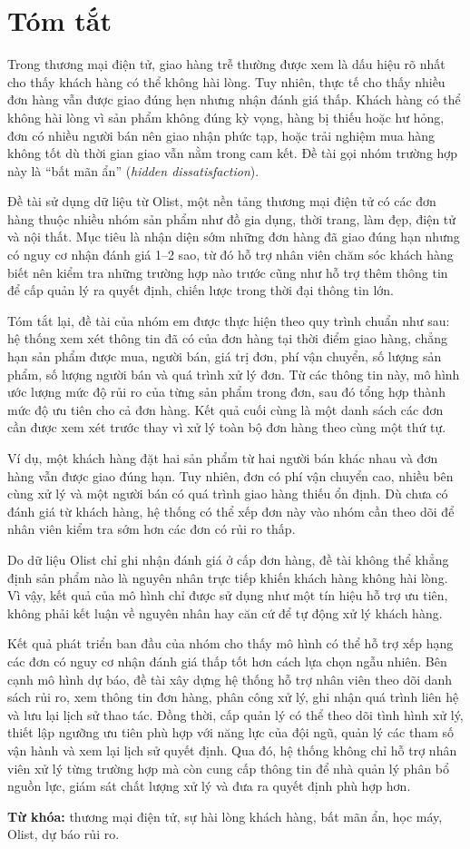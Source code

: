 \chapter*{Tóm tắt}

Trong thương mại điện tử, giao hàng trễ thường được xem là dấu hiệu rõ nhất cho thấy khách hàng có thể không hài lòng. Tuy nhiên, thực tế cho thấy nhiều đơn hàng vẫn được giao đúng hẹn nhưng nhận đánh giá thấp. Khách hàng có thể không hài lòng vì sản phẩm không đúng kỳ vọng, hàng bị thiếu hoặc hư hỏng, đơn có nhiều người bán nên giao nhận phức tạp, hoặc trải nghiệm mua hàng không tốt dù thời gian giao vẫn nằm trong cam kết. Đề tài gọi nhóm trường hợp này là ``bất mãn ẩn'' (\emph{hidden dissatisfaction}).

Đề tài sử dụng dữ liệu từ Olist, một nền tảng thương mại điện tử có các đơn hàng thuộc nhiều nhóm sản phẩm như đồ gia dụng, thời trang, làm đẹp, điện tử và nội thất. Mục tiêu là nhận diện sớm những đơn hàng đã giao đúng hạn nhưng có nguy cơ nhận đánh giá 1--2 sao, từ đó hỗ trợ nhân viên chăm sóc khách hàng biết nên kiểm tra những trường hợp nào trước cũng như hỗ trợ thêm thông tin để cấp quản lý ra quyết định, chiến lược trong thời đại thông tin lớn.

Tóm tắt lại, đề tài của nhóm em được thực hiện theo quy trình chuẩn như sau: hệ thống xem xét thông tin đã có của đơn hàng tại thời điểm giao hàng, chẳng hạn sản phẩm được mua, người bán, giá trị đơn, phí vận chuyển, số lượng sản phẩm, số lượng người bán và quá trình xử lý đơn. Từ các thông tin này, mô hình ước lượng mức độ rủi ro của từng sản phẩm trong đơn, sau đó tổng hợp thành mức độ ưu tiên cho cả đơn hàng. Kết quả cuối cùng là một danh sách các đơn cần được xem xét trước thay vì xử lý toàn bộ đơn hàng theo cùng một thứ tự.

Ví dụ, một khách hàng đặt hai sản phẩm từ hai người bán khác nhau và đơn hàng vẫn được giao đúng hạn. Tuy nhiên, đơn có phí vận chuyển cao, nhiều bên cùng xử lý và một người bán có quá trình giao hàng thiếu ổn định. Dù chưa có đánh giá từ khách hàng, hệ thống có thể xếp đơn này vào nhóm cần theo dõi để nhân viên kiểm tra sớm hơn các đơn có rủi ro thấp.

Do dữ liệu Olist chỉ ghi nhận đánh giá ở cấp đơn hàng, đề tài không thể khẳng định sản phẩm nào là nguyên nhân trực tiếp khiến khách hàng không hài lòng. Vì vậy, kết quả của mô hình chỉ được sử dụng như một tín hiệu hỗ trợ ưu tiên, không phải kết luận về nguyên nhân hay căn cứ để tự động xử lý khách hàng.

Kết quả phát triển ban đầu của nhóm cho thấy mô hình có thể hỗ trợ xếp hạng các đơn có nguy cơ nhận đánh giá thấp tốt hơn cách lựa chọn ngẫu nhiên. Bên cạnh mô hình dự báo, đề tài xây dựng hệ thống hỗ trợ nhân viên theo dõi danh sách rủi ro, xem thông tin đơn hàng, phân công xử lý, ghi nhận quá trình liên hệ và lưu lại lịch sử thao tác. Đồng thời, cấp quản lý có thể theo dõi tình hình xử lý, thiết lập ngưỡng ưu tiên phù hợp với năng lực của đội ngũ, quản lý các tham số vận hành và xem lại lịch sử quyết định. Qua đó, hệ thống không chỉ hỗ trợ nhân viên xử lý từng trường hợp mà còn cung cấp thông tin để nhà quản lý phân bổ nguồn lực, giám sát chất lượng xử lý và đưa ra quyết định phù hợp hơn.

\par\medskip
\noindent\textbf{Từ khóa:} thương mại điện tử, sự hài lòng khách hàng, bất mãn ẩn, học máy, Olist, dự báo rủi ro.
